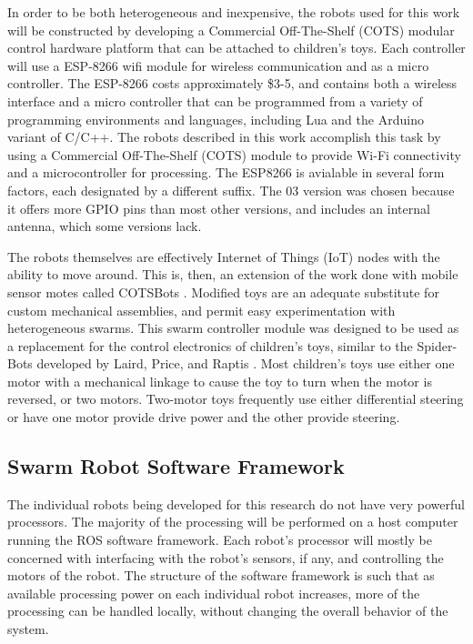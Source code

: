 \documentclass[]{article}
\begin{document}
In order to be both heterogeneous and inexpensive, the robots used for this work will be constructed by developing a Commercial Off-The-Shelf (COTS) modular control hardware platform that can be attached to children's toys. 
Each controller will use a ESP-8266 wifi module for wireless communication and as a micro controller. 
The ESP-8266 costs approximately \$3-5, and contains both a wireless interface and a micro controller that can be programmed from a variety of programming environments and languages, including Lua and the Arduino variant of C/C++.   
The robots described in this work accomplish this task by using a Commercial Off-The-Shelf (COTS) module to provide Wi-Fi connectivity and a microcontroller for processing. 
The ESP8266 is avialable in several form factors, each designated by a different suffix. 
The 03 version was chosen because it offers more GPIO pins than most other versions, and includes an internal antenna, which some versions lack. 

The robots themselves are effectively Internet of Things (IoT) nodes with the ability to move around. 
This is, then, an extension of the work done with mobile sensor motes called COTSBots \cite{bergbreiter2003cotsbots}.
Modified toys are an adequate substitute for custom mechanical assemblies, and permit easy experimentation with heterogeneous swarms. 
This swarm controller module was designed to be used as a replacement for the control electronics of children's toys, similar to the Spider-Bots developed by Laird, Price, and Raptis \cite{lairdspider}. 
Most children's toys use either one motor with a mechanical linkage to cause the toy to turn when the motor is reversed, or two motors.
Two-motor toys frequently use either differential steering or have one motor provide drive power and the other provide steering. 

\subsection{Swarm Robot Software Framework}

The individual robots being developed for this research do not have very powerful processors. 
The majority of the processing will be performed on a host computer running the ROS software framework. 
Each robot's processor will mostly be concerned with interfacing with the robot's sensors, if any, and controlling the motors of the robot. 
The structure of the software framework is such that as available processing power on each individual robot increases, more of the processing can be handled locally, without changing the overall behavior of the system.
\end{document}
